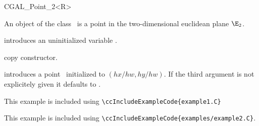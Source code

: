 \ccHtmlNoClassLinks
\ccHtmlNoClassIndex
\ccHtmlNoClassFile

\begin{ccClassTemplate} {CGAL_Point_2<R>}



\ccDefinition
An object of the class \ccClassName\ is a point in the two-dimensional
euclidean plane $\E_2$. 


\ccCreation
{}


\ccHidden {}
             {introduces an uninitialized variable \ccVar.}

\ccHidden {}
            {copy constructor.}

            {introduces a point \ccVar\ initialized to $(hx/hw,hy/hw)$.
             If the third argument is not explicitely given it defaults
             to .}

\end{ccClassTemplate} 

\ccExample

This example is included using \verb|\ccIncludeExampleCode{example1.C}|


This example is included using 
\verb|\ccIncludeExampleCode{examples/example2.C}|.


%
%
%
%
